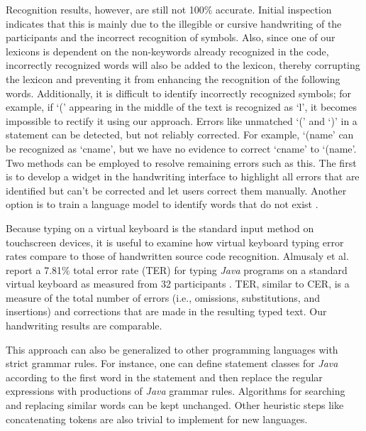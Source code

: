 \documentclass{vgtc}                          %
\begin{document}
Recognition results, however, are still not 100\% accurate. Initial inspection indicates that this is mainly due to the illegible or cursive handwriting of the participants and the incorrect recognition of symbols. Also, since one of our lexicons is dependent on the non-keywords already recognized in the code, incorrectly recognized words will also be added to the lexicon, thereby corrupting the lexicon and preventing it from enhancing the recognition of the following words. Additionally, it is difficult to identify incorrectly recognized symbols; for example, if `(' appearing in the middle of the text is recognized as `l', it becomes impossible to rectify it using our approach. 
Errors like unmatched `(' and `)' in a statement can be detected, but not reliably corrected. For example, `(name' can be recognized as `cname', but we have no evidence to correct `cname' to `(name'. Two methods can be employed to resolve remaining errors such as this. The first is to develop a widget in the handwriting interface to highlight all errors that are identified but can't be corrected and let users correct them manually. Another option is to train a language model to identify words that do not exist \cite{zamora2014neural}. 


Because typing on a virtual keyboard is the standard input method on touchscreen devices, it is useful to examine how virtual keyboard typing error rates compare to those of handwritten source code recognition.
Almusaly et al. report a 7.81\% total error rate (TER) for typing \textit{Java} programs on a standard virtual keyboard as measured from 32 participants \cite{almusaly2015syntax}. TER, similar to CER, is a measure of the total number of errors (i.e., omissions, substitutions, and insertions) and corrections that are made in the resulting typed text.  Our handwriting results are comparable.

This approach can also be generalized to other programming languages with strict grammar rules. For instance, one can define statement classes for \textit{Java} according to the first word in the statement and then replace the regular expressions with productions of \textit{Java} grammar rules.  Algorithms for searching and replacing similar words can be kept unchanged. Other heuristic steps like concatenating tokens are also trivial to implement for new languages. 
\end{document}
